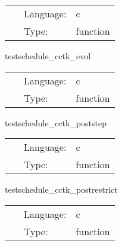  \begin{tabular*}{160mm}{cll} 
~ & Language:  & c \\ 
~ & Type:  & function \\ 
\end{tabular*} 


\vspace{5mm}


\hspace{5mm} testschedule\_cctk\_evol 

\hspace{5mm}{\it test to see if function is placed in schedule and run at cctk\_evol } 


\hspace{5mm}

 \begin{tabular*}{160mm}{cll} 
~ & Language:  & c \\ 
~ & Type:  & function \\ 
\end{tabular*} 


\vspace{5mm}


\hspace{5mm} testschedule\_cctk\_poststep 

\hspace{5mm}{\it test to see if function is placed in schedule and run at cctk\_poststep } 


\hspace{5mm}

 \begin{tabular*}{160mm}{cll} 
~ & Language:  & c \\ 
~ & Type:  & function \\ 
\end{tabular*} 


\vspace{5mm}


\hspace{5mm} testschedule\_cctk\_postrestrict 

\hspace{5mm}{\it test to see if function is placed in schedule and run at cctk\_postrestrict } 


\hspace{5mm}

 \begin{tabular*}{160mm}{cll} 
~ & Language:  & c \\ 
~ & Type:  & function \\ 
\end{tabular*} 


